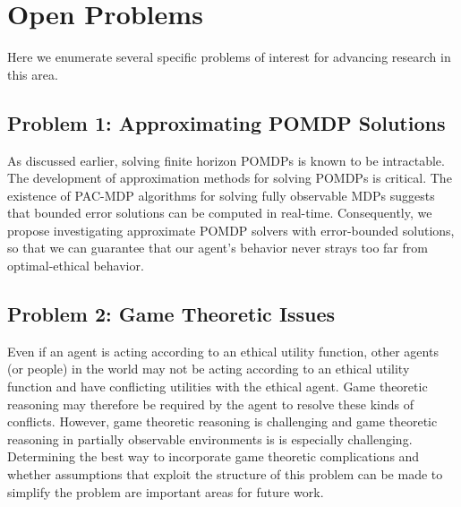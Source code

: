 \documentclass[11pt]{article}
\begin{document}
\section{Open Problems}

Here we enumerate several specific problems of interest for advancing research in this area.

\subsection{Problem 1: Approximating POMDP Solutions}  As discussed earlier, solving finite horizon POMDPs is known to be intractable. The development of approximation methods for solving POMDPs is critical. The existence of PAC-MDP algorithms for solving fully observable MDPs suggests that bounded error solutions can be computed in real-time. Consequently, we propose investigating approximate POMDP solvers with error-bounded solutions, so that we can guarantee that our agent's behavior never strays too far from optimal-ethical behavior.

\subsection{Problem 2: Game Theoretic Issues} Even if an agent is acting according to an ethical utility function, other agents (or people) in the world may not be acting according to an ethical utility function and have conflicting utilities with the ethical agent. Game theoretic reasoning may therefore be required by the agent to resolve these kinds of conflicts. However, game theoretic reasoning is challenging and game theoretic reasoning in partially observable environments is is especially challenging. Determining the best way to incorporate game theoretic complications and whether assumptions that exploit the structure of this problem can be made to simplify the problem are important areas for future work.

\end{document}
